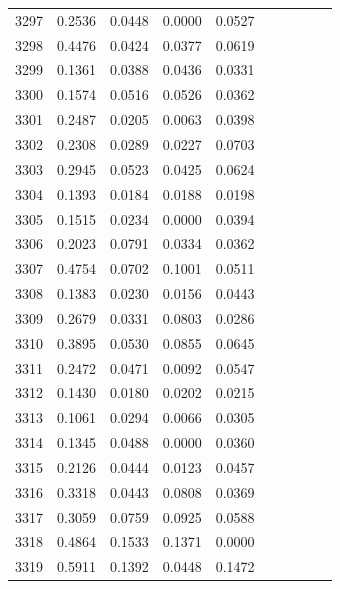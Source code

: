 \begin{table}
\begin{tabular}{cccccccccc}
3297& 0.2536& 0.0448& 0.0000& 0.0527\\ 
3298& 0.4476& 0.0424& 0.0377& 0.0619\\ 
3299& 0.1361& 0.0388& 0.0436& 0.0331\\ 
3300& 0.1574& 0.0516& 0.0526& 0.0362\\ 
3301& 0.2487& 0.0205& 0.0063& 0.0398\\ 
3302& 0.2308& 0.0289& 0.0227& 0.0703\\ 
3303& 0.2945& 0.0523& 0.0425& 0.0624\\ 
3304& 0.1393& 0.0184& 0.0188& 0.0198\\ 
3305& 0.1515& 0.0234& 0.0000& 0.0394\\ 
3306& 0.2023& 0.0791& 0.0334& 0.0362\\ 
3307& 0.4754& 0.0702& 0.1001& 0.0511\\ 
3308& 0.1383& 0.0230& 0.0156& 0.0443\\ 
3309& 0.2679& 0.0331& 0.0803& 0.0286\\ 
3310& 0.3895& 0.0530& 0.0855& 0.0645\\ 
3311& 0.2472& 0.0471& 0.0092& 0.0547\\ 
3312& 0.1430& 0.0180& 0.0202& 0.0215\\ 
3313& 0.1061& 0.0294& 0.0066& 0.0305\\ 
3314& 0.1345& 0.0488& 0.0000& 0.0360\\ 
3315& 0.2126& 0.0444& 0.0123& 0.0457\\ 
3316& 0.3318& 0.0443& 0.0808& 0.0369\\ 
3317& 0.3059& 0.0759& 0.0925& 0.0588\\ 
3318& 0.4864& 0.1533& 0.1371& 0.0000\\ 
3319& 0.5911& 0.1392& 0.0448& 0.1472\\ 
\hline 
\end{tabular} 
\\ 
\end{table} 

